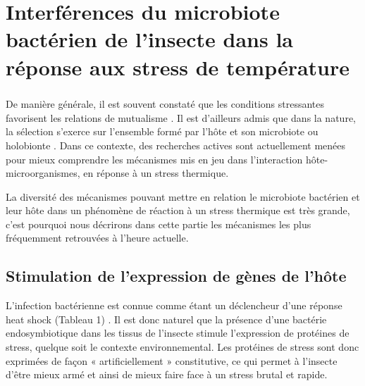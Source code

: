 \chapter{Interférences du microbiote bactérien de l'insecte dans la réponse aux stress de température} %

\paragraph*{}
De manière générale, il est souvent constaté que les conditions stressantes favorisent les relations de mutualisme \cite{meadows2013}.
Il est d'ailleurs admis que dans la nature, la sélection s'exerce sur l'ensemble formé par l'hôte et son microbiote ou holobionte \cite{rosenberg2008}.
Dans ce contexte, des recherches actives sont actuellement menées pour mieux comprendre les mécanismes mis en jeu dans l’interaction hôte-microorganismes, en réponse à un stress thermique.

La diversité des mécanismes pouvant mettre en relation le microbiote bactérien et leur hôte dans un phénomène de réaction à un stress thermique est très grande, c'est pourquoi nous décrirons dans cette partie les mécanismes les plus fréquemment retrouvées à l'heure actuelle.

\section{Stimulation de l'expression de gènes de l'hôte}

L'infection bactérienne est connue comme étant un déclencheur d'une réponse heat shock (Tableau 1) \cite{sorensen2003}.
Il est donc naturel que la présence d'une bactérie endosymbiotique dans les tissus de l'insecte stimule l'expression de protéines de stress, quelque soit le contexte environnemental.
Les protéines de stress sont donc exprimées de façon « artificiellement » constitutive, ce qui permet à l'insecte d'être mieux armé et ainsi de mieux faire face à un stress brutal et rapide.

